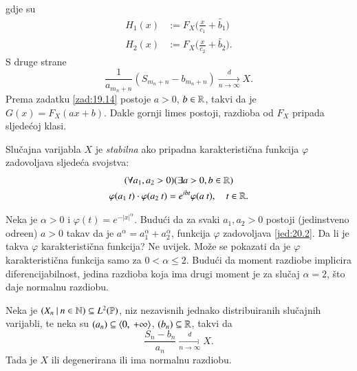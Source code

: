 gdje su
\begin{equation*}
    \begin{aligned}
        H_1 (x) &:= F_X \Big( \frac{x}{c_1} + \widetilde{b_1} \Big)\\
        H_2 (x) &:= F_X \Big( \frac{x}{c_2} + \widetilde{b_2} \Big).
    \end{aligned}
\end{equation*}
S druge strane
\begin{equation*}
    \frac{1}{a_{m_n + n}} (S_{m_n + n} - b_{m_n + n}) \xrightarrow[n \to \infty]{d} X.
\end{equation*}
Prema zadatku \ref{zad:19.14} postoje $a > 0$, $b \in \mathbb{R}$, takvi da je $G(x) = F_X (ax + b)$.
Dakle gornji limes postoji, razdioba od $F_X$ pripada sljede\' coj klasi.

\begin{defn}    \label{defn:20.1}
    Slu\v cajna varijabla $X$ je \emph{stabilna} ako pripadna karakteristi\v cna funkcija $\varphi$ zadovoljava sljede\' ca svojstva:
    \begin{equation}    \label{jed:20.2}
        \begin{gathered}
            (\forall a_1, a_2 > 0) (\exists a > 0, b \in \mathbb{R})\\
            \varphi (a_1 \: t) \cdot \varphi (a_2 \: t) = e^{i b t} \varphi (a \: t), \quad t \in \mathbb{R}.
        \end{gathered} 
    \end{equation}
\end{defn}

\begin{pr}  \label{pr:20.3}
    Neka je $\alpha > 0$ i $\varphi (t) = e^{-|x|^\alpha}$.
    Budu\' ci da za svaki $a_1, a_2 > 0$ postoji (jedinstveno odre\dj en) $a > 0$ takav da je $a^\alpha = a_1^\alpha + a_2^\alpha$, funkcija $\varphi$ zadovoljava \eqref{jed:20.2}.
    Da li je takva $\varphi$ karakteristi\v cna funkcija?
    Ne uvijek.
    Mo\v ze se pokazati da je $\varphi$ karakteristi\v cna funkcija samo za $0< \alpha \leq 2$.
    Budu\' ci da moment razdiobe implicira diferencijabilnost, jedina razdioba koja ima drugi moment je za slu\v caj $\alpha = 2$, \v sto daje normalnu razdiobu. 
\end{pr}

\begin{zad}[*]  \label{zad:20.4}
    Neka je $({X_n} \: | \: {n \in \mathbb{N}}) \subseteq L^2 (\mathbb{P})$, niz nezavisnih jednako distribuiranih slu\v cajnih varijabli, te neka su $(a_n) \subseteq \langle {0}, \: {+\infty} \rangle$, $(b_n) \subseteq \mathbb{R}$, takvi da
    \begin{equation*}
        \frac{S_n - b_n}{a_n} \xrightarrow[n \to \infty]{d} X.
    \end{equation*}
    Tada je $X$ ili degenerirana ili ima normalnu razdiobu.
\end{zad}

